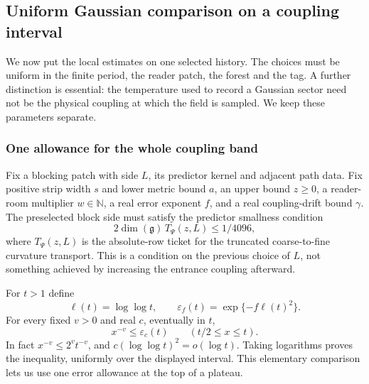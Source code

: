 \subsection{Uniform Gaussian comparison on a coupling interval}
\label{sec:actual-reader-dawn-selection}

We now put the local estimates on one selected history. The choices
must be uniform in the finite period, the reader patch, the forest
and the tag. A further distinction is essential: the temperature used
to record a Gaussian sector need not be the physical coupling at
which the field is sampled. We keep these parameters separate.

\subsubsection{One allowance for the whole coupling band}

Fix a blocking patch with side $L$, its predictor kernel and adjacent
path data. Fix positive strip width $s$ and lower metric bound $a$,
an upper bound $z\ge0$, a reader-room multiplier $w\in\mathbb N$,
a real error exponent $f$, and a real coupling-drift bound $\gamma$.
The preselected block side must satisfy the predictor smallness
condition
\[
 2\dim(\mathfrak g)\,T_\Psi(z,L)\le 1/4096,
\]
where $T_\Psi(z,L)$ is the absolute-row ticket for the truncated
coarse-to-fine curvature transport. This is a condition on the
previous choice of $L$, not something achieved by increasing the
entrance coupling afterward.

For $t>1$ define
\[
 \ell(t)=\log\log t,\qquad
 \varepsilon_f(t)=\exp\{-f\ell(t)^2\}.
\]
For every fixed $v>0$ and real $c$, eventually in $t$,
\begin{equation}\label{eq:reader-band-power}
 x^{-v}\le\varepsilon_c(t)\qquad(t/2\le x\le t).
\end{equation}
In fact $x^{-v}\le 2^vt^{-v}$, and
$c(\log\log t)^2=o(\log t)$. Taking logarithms proves the
inequality, uniformly over the displayed interval. This elementary
comparison lets us use one error allowance at the top of a plateau.

